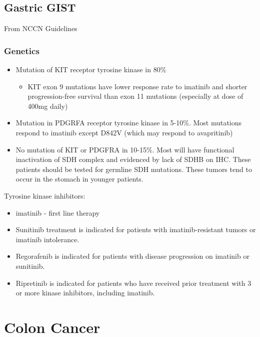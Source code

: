 \documentclass[
]{book}
\providecommand{\tightlist}{%
  \setlength{\itemsep}{0pt}\setlength{\parskip}{0pt}}
\begin{document}
\hypertarget{gastric-gist}{%
\chapter{Gastric GIST}\label{gastric-gist}}

From NCCN Guidelines

\hypertarget{genetics}{%
\section{Genetics}\label{genetics}}

\begin{itemize}
\tightlist
\item
  Mutation of KIT receptor tyrosine kinase in 80\%

  \begin{itemize}
  \tightlist
  \item
    KIT exon 9 mutations have lower response rate to imatinib and shorter progression-free survival than exon 11 mutations (especially at dose of 400mg daily)
  \end{itemize}
\item
  Mutation in PDGRFA receptor tyrosine kinase in 5-10\%. Most mutations respond to imatinib except D842V (which may respond to avapritinib)
\item
  No mutation of KIT or PDGFRA in 10-15\%. Most will have functional inactivation of SDH complex and evidenced by lack of SDHB on IHC. These patients should be tested for germline SDH mutations. These tumors tend to occur in the stomach in younger patients.
\end{itemize}

Tyrosine kinase inhibitors:

\begin{itemize}
\tightlist
\item
  imatinib - first line therapy
\item
  Sunitinib treatment is indicated for patients with imatinib-resistant tumors or imatinib intolerance.
\item
  Regorafenib is indicated for patients with disease progression on imatinib or sunitinib.
\item
  Ripretinib is indicated for patients who have received prior treatment with 3 or more kinase inhibitors, including imatinib.
\end{itemize}

\hypertarget{part-colon-cancer}{%
\part*{Colon Cancer}\label{part-colon-cancer}}
\end{document}
